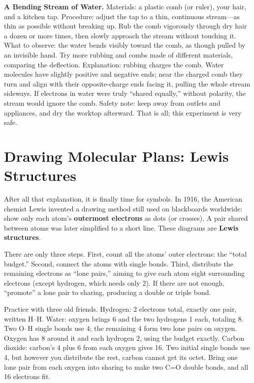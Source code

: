\begin{shiyan}
\textbf{A Bending Stream of Water.} Materials: a plastic comb (or ruler), your hair, and a kitchen tap. Procedure: adjust the tap to a thin, continuous stream---as thin as possible without breaking up. Rub the comb vigorously through dry hair a dozen or more times, then slowly approach the stream without touching it. What to observe: the water bends visibly toward the comb, as though pulled by an invisible hand. Try more rubbing and combs made of different materials, comparing the deflection. Explanation: rubbing charges the comb. Water molecules have slightly positive and negative ends; near the charged comb they turn and align with their opposite-charge ends facing it, pulling the whole stream sideways. If electrons in water were truly ``shared equally,'' without polarity, the stream would ignore the comb. Safety note: keep away from outlets and appliances, and dry the worktop afterward. That is all; this experiment is very safe.
\end{shiyan}

\section{Drawing Molecular Plans: Lewis Structures}

After all that explanation, it is finally time for symbols. In 1916, the American chemist Lewis invented a drawing method still used on blackboards worldwide: show only each atom's \textbf{outermost electrons} as dots (or crosses). A pair shared between atoms was later simplified to a short line. These diagrams are \textbf{Lewis structures}.

There are only three steps. First, count all the atoms' outer electrons: the ``total budget.'' Second, connect the atoms with single bonds. Third, distribute the remaining electrons as ``lone pairs,'' aiming to give each atom eight surrounding electrons (except hydrogen, which needs only 2). If there are not enough, ``promote'' a lone pair to sharing, producing a double or triple bond.

Practice with three old friends. Hydrogen: 2 electrons total, exactly one pair, written H--H. Water: oxygen brings 6 and the two hydrogens 1 each, totaling 8. Two O--H single bonds use 4; the remaining 4 form two lone pairs on oxygen. Oxygen has 8 around it and each hydrogen 2, using the budget exactly. Carbon dioxide: carbon's 4 plus 6 from each oxygen gives 16. Two initial single bonds use 4, but however you distribute the rest, carbon cannot get its octet. Bring one lone pair from each oxygen into sharing to make two C=O double bonds, and all 16 electrons fit.

